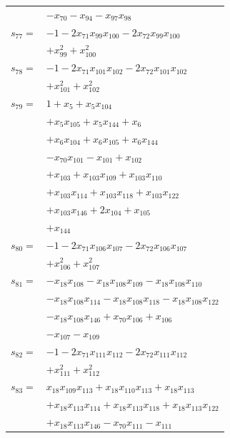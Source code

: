\begin{longtable}{@{}r@{\;}l@{}}
 & \(\displaystyle -x_{70} -x_{94} -x_{97}x_{98}\) \\[3pt]
\(s_{77}=\) & \(\displaystyle -1 -2x_{71}x_{99}x_{100} -2x_{72}x_{99}x_{100}\) \\
 & \(\displaystyle +x_{99}^{2} +x_{100}^{2}\) \\[3pt]
\(s_{78}=\) & \(\displaystyle -1 -2x_{71}x_{101}x_{102} -2x_{72}x_{101}x_{102}\) \\
 & \(\displaystyle +x_{101}^{2} +x_{102}^{2}\) \\[3pt]
\(s_{79}=\) & \(\displaystyle 1 +x_{5} +x_{5}x_{104}\) \\
 & \(\displaystyle +x_{5}x_{105} +x_{5}x_{144} +x_{6}\) \\
 & \(\displaystyle +x_{6}x_{104} +x_{6}x_{105} +x_{6}x_{144}\) \\
 & \(\displaystyle -x_{70}x_{101} -x_{101} +x_{102}\) \\
 & \(\displaystyle +x_{103} +x_{103}x_{109} +x_{103}x_{110}\) \\
 & \(\displaystyle +x_{103}x_{114} +x_{103}x_{118} +x_{103}x_{122}\) \\
 & \(\displaystyle +x_{103}x_{146} +2x_{104} +x_{105}\) \\
 & \(\displaystyle +x_{144}\) \\[3pt]
\(s_{80}=\) & \(\displaystyle -1 -2x_{71}x_{106}x_{107} -2x_{72}x_{106}x_{107}\) \\
 & \(\displaystyle +x_{106}^{2} +x_{107}^{2}\) \\[3pt]
\(s_{81}=\) & \(\displaystyle -x_{18}x_{108} -x_{18}x_{108}x_{109} -x_{18}x_{108}x_{110}\) \\
 & \(\displaystyle -x_{18}x_{108}x_{114} -x_{18}x_{108}x_{118} -x_{18}x_{108}x_{122}\) \\
 & \(\displaystyle -x_{18}x_{108}x_{146} +x_{70}x_{106} +x_{106}\) \\
 & \(\displaystyle -x_{107} -x_{109}\) \\[3pt]
\(s_{82}=\) & \(\displaystyle -1 -2x_{71}x_{111}x_{112} -2x_{72}x_{111}x_{112}\) \\
 & \(\displaystyle +x_{111}^{2} +x_{112}^{2}\) \\[3pt]
\(s_{83}=\) & \(\displaystyle x_{18}x_{109}x_{113} +x_{18}x_{110}x_{113} +x_{18}x_{113}\) \\
 & \(\displaystyle +x_{18}x_{113}x_{114} +x_{18}x_{113}x_{118} +x_{18}x_{113}x_{122}\) \\
 & \(\displaystyle +x_{18}x_{113}x_{146} -x_{70}x_{111} -x_{111}\) \\

\end{longtable}
